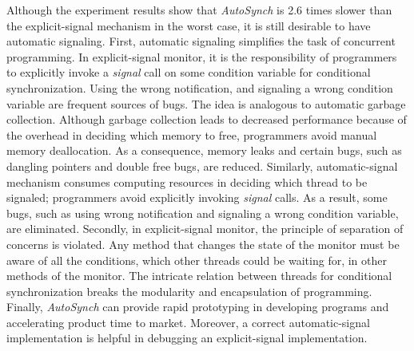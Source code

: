 \documentclass{sigplanconf}
\begin{document}
Although the experiment results show that {\em AutoSynch} is 2.6 times slower than 
the explicit-signal mechanism in the worst case, it is still desirable to have automatic signaling.
First, automatic signaling simplifies the task of concurrent programming.
            In explicit-signal monitor, it is the responsibility of programmers to 
        explicitly invoke a {\em signal} call on some condition variable for
        conditional synchronization. Using the wrong notification, and signaling
        a wrong condition variable are frequent sources of bugs.  The idea is analogous to automatic
        garbage collection.
Although garbage collection leads to decreased
performance because of the overhead in deciding which memory to free, programmers 
avoid manual memory deallocation. As a consequence, memory leaks and certain 
bugs, such as dangling pointers and double free bugs, are reduced. 
Similarly, automatic-signal mechanism consumes computing resources 
in deciding which thread to be signaled; programmers avoid explicitly invoking 
{\em signal} calls. As a result, some bugs, such as using wrong notification and
signaling a wrong condition variable, are eliminated.  Secondly,
 in explicit-signal monitor, the principle of separation of concerns is violated.
    Any method that changes the state of the monitor must be aware of all the 
    conditions, which other threads could be waiting for, 
    in other methods of the monitor. 
     The intricate relation between
        threads for conditional synchronization breaks the modularity and 
        encapsulation of programming.  
   Finally,
  {\em AutoSynch} can provide  
        rapid prototyping  in developing programs and accelerating 
        product time to market. Moreover, 
        a correct
        automatic-signal implementation is helpful in debugging an
        explicit-signal implementation. 



\end{document}
